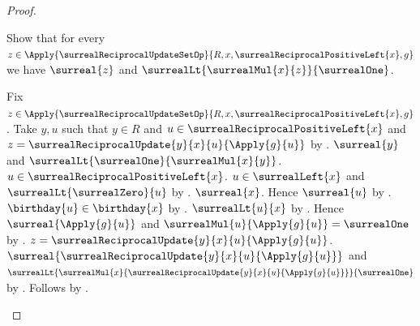 \begin{proof}
\begin{subproof}
        Show that for every
            $z\in\Apply{\surrealReciprocalUpdateSetOp}{R,x,\surrealReciprocalPositiveLeft{x},g}$ we have
            $\surreal{z}$ and
                $\surrealLt{\surrealMul{x}{z}}{\surrealOne}$.
        \begin{subproof}
            Fix $z\in\Apply{\surrealReciprocalUpdateSetOp}{R,x,\surrealReciprocalPositiveLeft{x},g}$.
            Take $y,u$ such that $y\in R$ and
                $u\in\surrealReciprocalPositiveLeft{x}$ and
                $z=\surrealReciprocalUpdate{y}{x}{u}{\Apply{g}{u}}$
                by .
            $\surreal{y}$ and
                $\surrealLt{\surrealOne}{\surrealMul{x}{y}}$.
            $u\in\surrealReciprocalPositiveLeft{x}$.
            $u\in\surrealLeft{x}$ and
                $\surrealLt{\surrealZero}{u}$
                by .
            $\surreal{x}$.
            Hence $\surreal{u}$ by .
            $\birthday{u}\in\birthday{x}$
                by .
            $\surrealLt{u}{x}$ by .
            Hence $\surreal{\Apply{g}{u}}$ and
                $\surrealMul{u}{\Apply{g}{u}}=\surrealOne$
                by \auto.
            $z=\surrealReciprocalUpdate{y}{x}{u}{\Apply{g}{u}}$.
            $\surreal{\surrealReciprocalUpdate{y}{x}{u}{\Apply{g}{u}}}$
                and $\surrealLt{
                    \surrealMul{x}{\surrealReciprocalUpdate{y}{x}{u}{\Apply{g}{u}}}}
                    {\surrealOne}$ by
                .
            Follows by \auto.
        \end{subproof}


\end{subproof}
\end{proof}
